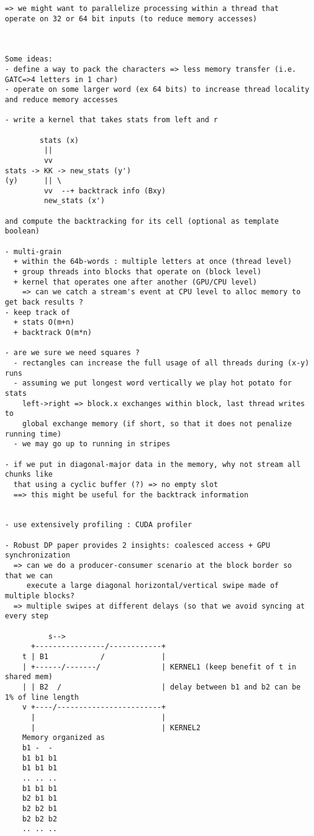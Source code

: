 \documentclass[11pt]{article}
\begin{document}
\begin{verbatim}
=> we might want to parallelize processing within a thread that operate on 32 or 64 bit inputs (to reduce memory accesses)



Some ideas:
- define a way to pack the characters => less memory transfer (i.e. GATC=>4 letters in 1 char)
- operate on some larger word (ex 64 bits) to increase thread locality and reduce memory accesses

- write a kernel that takes stats from left and r

		stats (x)
		 ||
		 vv
stats -> KK -> new_stats (y')
(y)		 || \
		 vv  --+ backtrack info (Bxy)
		 new_stats (x')

and compute the backtracking for its cell (optional as template boolean)

- multi-grain
  + within the 64b-words : multiple letters at once (thread level)
  + group threads into blocks that operate on (block level)
  + kernel that operates one after another (GPU/CPU level)
    => can we catch a stream's event at CPU level to alloc memory to get back results ?
- keep track of
  + stats O(m+n)
  + backtrack O(m*n)

- are we sure we need squares ?
  - rectangles can increase the full usage of all threads during (x-y) runs
  - assuming we put longest word vertically we play hot potato for stats
    left->right => block.x exchanges within block, last thread writes to
    global exchange memory (if short, so that it does not penalize running time)
  - we may go up to running in stripes

- if we put in diagonal-major data in the memory, why not stream all chunks like
  that using a cyclic buffer (?) => no empty slot
  ==> this might be useful for the backtrack information


- use extensively profiling : CUDA profiler

- Robust DP paper provides 2 insights: coalesced access + GPU synchronization
  => can we do a producer-consumer scenario at the block border so that we can
     execute a large diagonal horizontal/vertical swipe made of multiple blocks?
  => multiple swipes at different delays (so that we avoid syncing at every step

          s-->
  	  +----------------/------------+
	t | B1            /             |
	| +------/-------/              | KERNEL1 (keep benefit of t in shared mem)
	| | B2  /                       | delay between b1 and b2 can be 1% of line length
	v +----/------------------------+
	  |                             |
	  |                             | KERNEL2
	Memory organized as
	b1 -  -
	b1 b1 b1
	b1 b1 b1
	.. .. ..
	b1 b1 b1
	b2 b1 b1
	b2 b2 b1
	b2 b2 b2
	.. .. ..


\end{verbatim}
\end{document}
